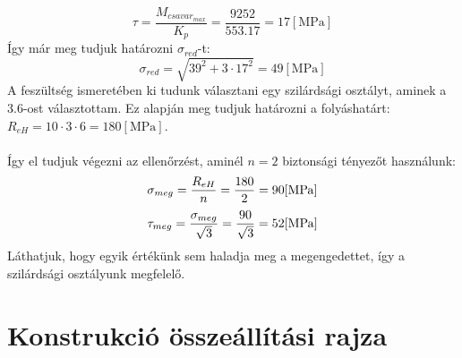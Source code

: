 \documentclass[10pt, a4paper]{article}
\newcommand{\mpa}{\mathrm{\left[MPa\right]}}
\begin{document}
	\begin{equation}
			\tau = \dfrac{M_{csavar_{max}}}{K_p} = \dfrac{9252}{553.17} = 17 \mpa\tag{6.2}
	\end{equation}
	\newpage
	Így már meg tudjuk határozni $\sigma_{red}$-t:
	\begin{equation}
		\sigma_{red} = \sqrt{39^2 + 3 \cdot 17^2} = 49 \mpa\tag{6}
	\end{equation}
	A feszültség ismeretében ki tudunk választani egy szilárdsági osztályt, aminek a 3.6-ost választottam. Ez alapján meg tudjuk határozni a folyáshatárt: $R_{eH} = 10 \cdot 3 \cdot 6 = 180 \mpa$.\\\\
	Így el tudjuk végezni az ellenőrzést, aminél $n = 2$ biztonsági tényezőt használunk:
	\begin{equation}
		\sigma_{meg} = \dfrac{R_{eH}}{n} = \dfrac{180}{2} = 90 \mpa\notag
	\end{equation}
	\begin{equation}
		\tau_{meg} = \dfrac{\sigma_{meg}}{\sqrt{3}} = \dfrac{90}{\sqrt{3}} = 52 \mpa\notag
	\end{equation}
	Láthatjuk, hogy egyik értékünk sem haladja meg a megengedettet, így a szilárdsági osztályunk megfelelő.
	\section{Konstrukció összeállítási rajza}
	
\end{document}
